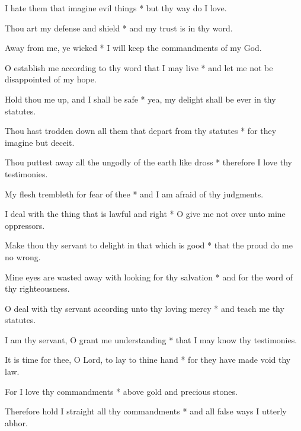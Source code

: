 I hate them that imagine evil things * but thy way do I love.

Thou art my defense and shield * and my trust is in thy word.

Away from me, ye wicked * I will keep the commandments of my God.

O establish me according to thy word that I may live * and let me not be disappointed of my hope.

Hold thou me up, and I shall be safe * yea, my delight shall be ever in thy statutes.

Thou hast trodden down all them that depart from thy statutes * for they imagine but deceit.

Thou puttest away all the ungodly of the earth like dross * therefore I love thy testimonies.

My flesh trembleth for fear of thee * and I am afraid of thy judgments.

I deal with the thing that is lawful and right * O give me not over unto mine oppressors.

Make thou thy servant to delight in that which is good * that the proud do me no wrong.

Mine eyes are wasted away with looking for thy salvation * and for the word of thy righteousness.

O deal with thy servant according unto thy loving mercy * and teach me thy statutes.

I am thy servant, O grant me understanding * that I may know thy testimonies.

It is time for thee, O Lord, to lay to thine hand * for they have made void thy law.

For I love thy commandments * above gold and precious stones.

Therefore hold I straight all thy commandments * and all false ways I utterly abhor. 